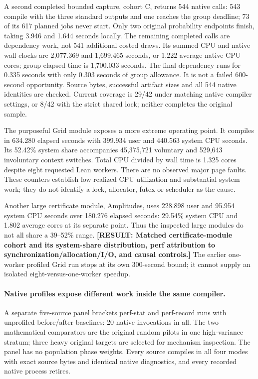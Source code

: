 \documentclass[10pt,twocolumn]{article}
\newcommand{\missing}[1]{\textbf{[RESULT: #1]}}
\begin{document}
A second completed bounded capture, cohort C, returns 544 native calls:
543 compile with the three standard outputs and one reaches the group
deadline; 73 of its 617 planned jobs never start.
Only two original probability endpoints finish, taking 3.946 and
1.644 seconds locally. The remaining completed calls are dependency work,
not 541 additional costed draws.
Its summed CPU and native wall clocks are 2,077.369 and 1,699.465 seconds,
or 1.222 average native CPU cores; group elapsed time is 1,700.033 seconds.
The final dependency runs for 0.335 seconds with only 0.303 seconds of
group allowance. It is not a failed 600-second opportunity.
Source bytes, successful artifact sizes and all 544 native identities are
checked. Current coverage is 29/42 under matching native compiler settings,
or 8/42 with the strict shared lock; neither completes the original sample.


The purposeful Grid module exposes a more extreme operating point.
It compiles in 634.280 elapsed seconds with 399.934 user and 440.563
system CPU seconds. Its 52.42\% system share accompanies 45,375,721
voluntary and 529,643 involuntary context switches.
Total CPU divided by wall time is 1.325 cores despite eight requested Lean
workers. There are no observed major page faults.
These counters establish low realized CPU utilization and substantial
system work; they do not identify a lock, allocator, futex or scheduler
as the cause.

Another large certificate module, Amplitudes, uses 228.898 user and
95.954 system CPU seconds over 180.276 elapsed seconds:
29.54\% system CPU and 1.802 average cores at its separate point.
Thus the inspected large modules do not all share a 39--52\% range.
\missing{Matched certificate-module cohort and its system-share distribution,
perf attribution to synchronization/allocation/I/O, and causal controls.}
The earlier one-worker profiled Grid run stops at its own 300-second bound;
it cannot supply an isolated eight-versus-one-worker speedup.

\paragraph{Native profiles expose different work inside the same compiler.}
A separate five-source panel brackets perf-stat and perf-record runs with
unprofiled before/after baselines: 20 native invocations in all.
The two mathematical comparators are the original random pilots in one
high-variance stratum; three heavy original targets are selected for
mechanism inspection. The panel has no population phase weights.
Every source compiles in all four modes with exact source bytes and
identical native diagnostics, and every recorded native process retires.
\end{document}
